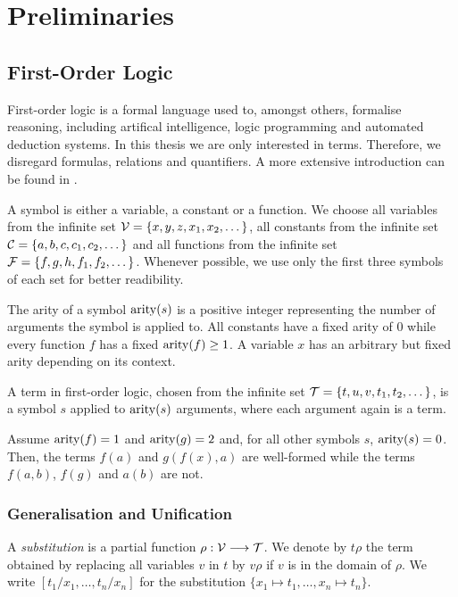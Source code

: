 \chapter{Preliminaries} \label{prelim}
\section{First-Order Logic}
First-order logic is a formal language used to, amongst others, formalise reasoning, including artifical intelligence, logic programming and automated deduction systems. In this thesis we are only interested in terms. Therefore, we disregard formulas, relations and quantifiers. A more extensive introduction can be found in \cite{abiteboul_foundations_1995}.

A symbol is either a variable, a constant or a function. We choose all variables from the infinite set $\mathcal{V} = \{x, y, z, x_{1}, x_{2}, \dots\}$, all constants from the infinite set $\mathcal{C} = \{a, b, c, c_{1}, c_{2}, \dots\}$ and all functions from the infinite set $\mathcal{F} = \{f, g, h, f_{1}, f_{2}, \dots\}$. Whenever possible, we use only the first three symbols of each set for better readibility.

The arity of a symbol $\mathrm{arity}(s)$ is a positive integer representing the number of arguments the symbol is applied to. All constants have a fixed arity of $0$ while every function $f$ has a fixed $\mathrm{arity}(f) \geq 1$. A variable $x$ has an arbitrary but fixed arity depending on its context.

A term in first-order logic, chosen from the infinite set $\mathcal{T} = \{t, u, v, t_{1}, t_{2}, \dots\}$, is a symbol $s$ applied to $\mathrm{arity}(s)$ arguments, where each argument again is a term.

\begin{exmpl}
Assume $\mathrm{arity}(f) = 1$ and $\mathrm{arity}(g) = 2$ and, for all other symbols $s$, $\mathrm{arity}(s) = 0$. Then, the terms $f(a)$ and $g(f(x), a)$ are well-formed while the terms $f(a,b)$, $f(g)$ and $a(b)$ are not.
\end{exmpl}

\subsection{Generalisation and Unification}
\begin{defn}
  A \emph{substitution} is a partial function $\rho : \mathcal{V} \longrightarrow \mathcal{T}$. We denote by $t \rho$ the term obtained by replacing all variables $v$ in $t$ by $v \rho$ if $v$ is in the domain of $\rho$. We write $[t_{1}/x_{1},\dots,t_{n}/x_{n}]$ for the substitution $\{x_{1} \mapsto t_{1}, \dots, x_{n} \mapsto t_{n}\}$.
\end{defn}

